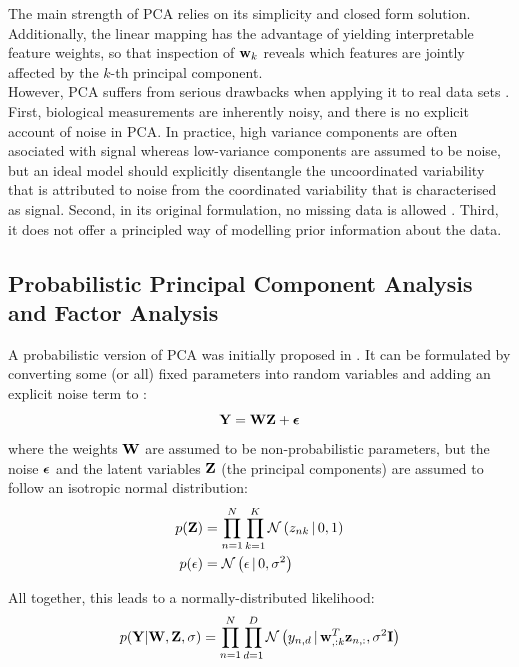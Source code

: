 The main strength of PCA relies on its simplicity and closed form solution. Additionally, the linear mapping has the advantage of yielding interpretable feature weights, so that inspection of ${\bf w}_k$ reveals which features are jointly affected by the $k$-th principal component.\\
However, PCA suffers from serious drawbacks when applying it to real data sets \cite{Li2017b}. First, biological measurements are inherently noisy, and there is no explicit account of noise in PCA. In practice, high variance components are often asociated with signal whereas low-variance components are assumed to be noise, but an ideal model should explicitly disentangle the uncoordinated variability that is attributed to noise from the coordinated variability that is characterised as signal. Second, in its original formulation, no missing data is allowed \cite{Ilin2010}. Third, it does not offer a principled way of modelling prior information about the data.

\subsection{Probabilistic Principal Component Analysis and Factor Analysis} \label{section:probabilistic_pca}
A probabilistic version of PCA was initially proposed in \cite{Tipping1999}. It can be formulated by converting some (or all) fixed parameters into random variables and adding an explicit noise term to :
\begin{equation}
	{\bf Y} = {\bf W} {\bf Z} + \mbox{\boldmath $\epsilon$}
\end{equation}
where the weights ${\bf W}$ are assumed to be non-probabilistic parameters, but the noise $\mbox{\boldmath $\epsilon$}$ and the latent variables ${\bf Z}$ (the principal components) are assumed to follow an isotropic normal distribution:
\begin{align*}
	p({\bf Z}) &= \prod_{n=1}^{N} \prod_{k=1}^{K} \mathcal{N}\left(z_{nk} \,|\, 0,1\right) \\
	p(\epsilon) &= \mathcal{N}\left(\epsilon \,|\, 0,\sigma^2\right)
\end{align*}

All together, this leads to a normally-distributed likelihood:
\begin{equation} \label{eq:ppca_lik}
	p({\bf Y}|{\bf W},{\bf Z},\sigma) = \prod_{n=1}^{N} \prod_{d=1}^{D} \mathcal{N}\left(y_{n,d} \,|\, {\bf w}_{,:k}^T {\bf z}_{n,:},\sigma^2 {\bf I}\right)
\end{equation}

